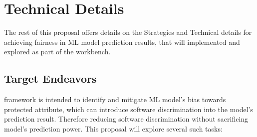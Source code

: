 






\section{ Technical Details}\label{tion:details}



The rest of this proposal offers details  on the Strategies and Technical details for achieving fairness in ML model prediction results, that will implemented and explored as part
of the {\IT} workbench. 

\subsection{Target Endeavors}\label{tion:ende}

{\IT} framework is intended to identify and mitigate ML model's bias towards protected attribute, which can introduce software discrimination into the model's prediction result. Therefore reducing software discrimination without sacrificing model's prediction power. This proposal will explore
several  such tasks:


